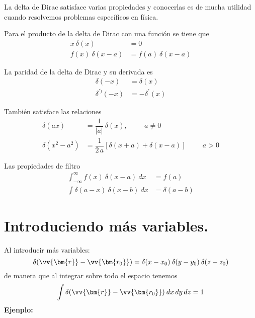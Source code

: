 La delta de Dirac satisface varias propiedades y conocerlas es de mucha utilidad cuando resolvemos problemas específicos en física. 
\par
\begin{propiedad}
Para el producto de la delta de Dirac con una función se tiene que
\begin{align}
x \: \delta(x) &= 0 \\
f(x) \: \delta(x - a) &= f(a) \: \delta(x - a)
\end{align}
\end{propiedad}
\begin{propiedad}
La paridad de la delta de Dirac y su derivada es
\begin{align}
\delta (-x) &= \delta (x) \\
\delta^{\prime)} (-x) &= - \delta^{\prime} (x)
\end{align}
\end{propiedad}
\begin{propiedad}
También satisface las relaciones
\begin{align}
\delta(ax) &= \dfrac{1}{\vert a \vert} \: \delta (x), \hspace{1cm} a \neq 0 \\
\delta (x^{2} - a^{2}) &= \dfrac{1}{2 \, a} \left[ \delta (x + a) + \delta (x - a) \right] \hspace{1cm} a > 0
\end{align}
\end{propiedad}
\begin{propiedad}
Las propiedades de filtro
\begin{align}
\int_{-\infty}^{\infty} f(x) \: \delta (x - a) \: dx &= f(a) \\
\int \delta (a - x) \: \delta (x - b) \: dx &= \delta (a - b)
\end{align}
\end{propiedad}
\section{Introduciendo más variables.}
Al introducir más variables:
\begin{equation}
\delta (\vv{\bm{r}} - \vv{\bm{r_{0}}}) = \delta (x - x_{0}) \: \delta (y - y_{0}) \: \delta (z - z_{0})
\label{eq:ecuacion_A_03}
\end{equation}
de manera que al integrar sobre todo el espacio tenemos
\[ \int \delta (\vv{\bm{r}} - \vv{\bm{r_{0}}}) \: dx \, dy \, dz = 1 \]
\textbf{Ejenplo:}

